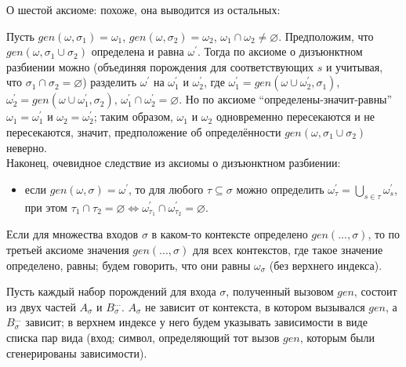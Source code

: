 





\hrulefill

О шестой аксиоме: похоже, она выводится из остальных:

Пусть $gen(\omega,\sigma_1) = \omega_1$, $gen(\omega,\sigma_2) = \omega_2$, $\omega_1\cap\omega_2\ne\varnothing$. Предположим, что $gen(\omega,\sigma_1\cup\sigma_2)$ определена и равна $\omega^\prime$. Тогда по аксиоме о дизъюнктном разбиении можно (объединяя порождения для соответствующих $s$ и учитывая, что $\sigma_1\cap\sigma_2 = \varnothing$) разделить $\omega^\prime$ на $\omega^\prime_1$ и $\omega^\prime_2$, где $\omega^\prime_1 = gen(\omega\cup\omega^\prime_2,\sigma_1)$, $\omega^\prime_2 = gen(\omega\cup\omega^\prime_1,\sigma_2)$, $\omega^\prime_1 \cap \omega^\prime_2 = \varnothing$. Но по аксиоме ``определены-значит-равны'' $\omega_1 = \omega^\prime_1$ и $\omega_2 = \omega^\prime_2$; таким образом, $\omega_1$ и $\omega_2$ одновременно пересекаются и не пересекаются, значит, предположение об определённости $gen(\omega,\sigma_1\cup\sigma_2)$ неверно.
\\

Наконец, очевидное следствие из аксиомы о дизъюнктном разбиении:

\begin{itemize}
	\item если $gen(\omega,\sigma)=\omega^\prime$, то для любого $\tau \subseteq \sigma$ можно определить $\omega^\prime_\tau =\bigcup\limits_{s\in\tau}\omega^\prime_s$, при этом $\tau_1 \cap \tau_2 = \varnothing \Leftrightarrow \omega^\prime_{\tau_1} \cap \omega^\prime_{\tau_2} = \varnothing$.
\end{itemize}

Если для множества входов $\sigma$ в каком-то контексте определено $gen(..., \sigma)$, то по третьей аксиоме значения $gen(..., \sigma)$ для всех контекстов, где такое значение определено, равны; будем говорить, что они равны $\omega_\sigma$ (без верхнего индекса).

\newpage

\newcommand{\ssrsx}{{\sigma\setminus\rho\setminus\xi}}

Пусть каждый набор порождений для входа $\sigma$, полученный вызовом $gen$, состоит из двух частей $A_\sigma$ и $B^{...}_\sigma$. $A_\sigma$ не зависит от контекста, в котором вызывался $gen$, а $B^{...}_\sigma$ зависит; в верхнем индексе у него будем указывать зависимости в виде списка пар вида (вход; символ, определяющий тот вызов $gen$, которым были сгенерированы зависимости).

